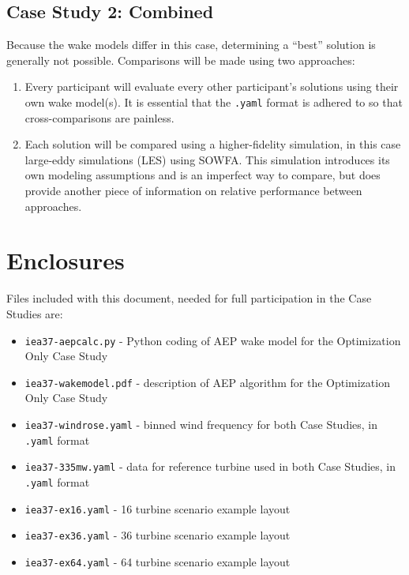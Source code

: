 \documentclass{article}
\begin{document}
    \subsection{Case Study 2: Combined}

        Because the wake models differ in this case, determining a ``best'' solution is generally not possible.  Comparisons will be made using two approaches:
        \begin{enumerate}
            \item Every participant will evaluate every other participant's solutions using their own wake model(s).  It is essential that the \texttt{.yaml} format is adhered to so that cross-comparisons are painless. %
            \item Each solution will be compared using a higher-fidelity simulation, in this case large-eddy simulations (LES) using SOWFA.  This simulation introduces its own modeling assumptions and is an imperfect way to compare, but does provide another piece of information on relative performance between approaches. %
        \end{enumerate}

\section{Enclosures}
    Files included with this document, needed for full participation in the Case Studies are:

    \begin{itemize}[noitemsep,topsep=0pt,parsep=0pt,partopsep=0pt]
        \item \texttt{iea37-aepcalc.py} - Python coding of AEP wake model for the Optimization Only Case Study
        \item \texttt{iea37-wakemodel.pdf} - description of AEP algorithm for the Optimization Only Case Study
        \item \texttt{iea37-windrose.yaml} - binned wind frequency for both Case Studies, in \texttt{.yaml} format
        \item \texttt{iea37-335mw.yaml} - data for reference turbine used in both Case Studies, in \texttt{.yaml} format
        \item \texttt{iea37-ex16.yaml} - 16 turbine scenario example layout
        \item \texttt{iea37-ex36.yaml} - 36 turbine scenario example layout
        \item \texttt{iea37-ex64.yaml} - 64 turbine scenario example layout
    \end{itemize}
\newpage


\end{document}
